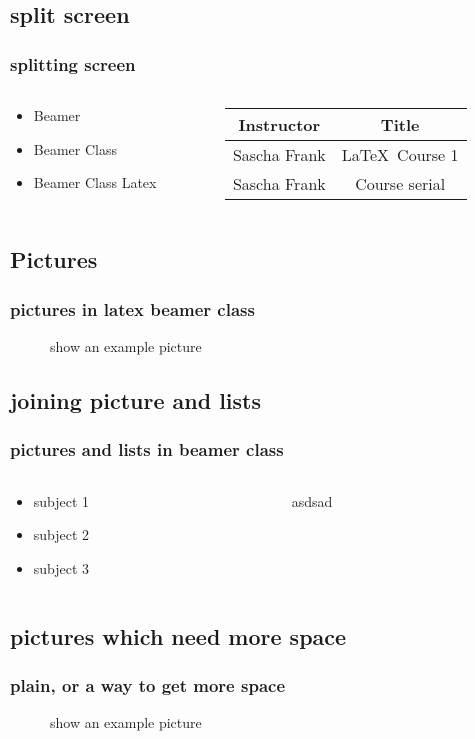 \documentclass{beamer}
\begin{document}
\subsection{split screen}

\begin{frame}\frametitle{splitting screen}
\begin{columns}
\begin{column}{5cm}
\begin{itemize}
\item Beamer 
\item Beamer Class 
\item Beamer Class Latex 
\end{itemize}
\end{column}
\begin{column}{5cm}
\begin{tabular}{|c|c|}
\hline
\textbf{Instructor} & \textbf{Title} \\
\hline
Sascha Frank &  \LaTeX \ Course 1 \\
\hline
Sascha Frank &  Course serial  \\
\hline
\end{tabular}
\end{column}
\end{columns}
\end{frame}

\subsection{Pictures} 
\begin{frame}\frametitle{pictures in latex beamer class}
\begin{figure}
\caption{show an example picture}
\end{figure}
\end{frame}

\subsection{joining picture and lists} 

\begin{frame}
\frametitle{pictures and lists in beamer class}
\begin{columns}
\begin{column}{5cm}
\begin{itemize}
\item<1-> subject 1
\item<3-> subject 2
\item<5-> subject 3
\end{itemize}
\vspace{3cm} 
\end{column}
\begin{column}{5cm}
asdsad
\end{column}
\end{columns}
\end{frame}


\subsection{pictures which need more space} 
\begin{frame}[plain]
\frametitle{plain, or a way to get more space}
\begin{figure}
\caption{show an example picture}
\end{figure}
\end{frame}
\end{document}
